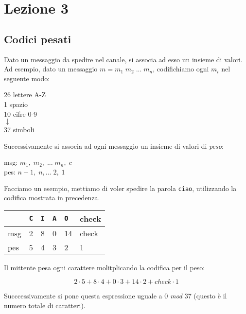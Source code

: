 \section*{Lezione 3}

\subsection*{Codici pesati}
Dato un messaggio da spedire nel canale, si associa ad esso un insieme di valori.
Ad esempio, dato un messaggio $m = m_1 \; m_2 \; ... \; m_n$, codifichiamo ogni $m_i$ nel seguente modo:
\begin{center}
	26 lettere A-Z\\
	1 spazio \textvisiblespace\\
	10 cifre 0-9\\
	$\downarrow$\\
	37 simboli
\end{center}

Successivamente si associa ad ogni messaggio un insieme di valori di \textit{peso}:

\begin{center}
	 msg: $m_1, \; m_2, \; ... \; m_n, \; c$\\
	 pes: $n+1, \; n, ... \; 2, \; 1 $
\end{center}

Facciamo un esempio, mettiamo di voler spedire la parola \texttt{ciao}, utilizzando la codifica mostrata in precedenza.

\begin{table}[h]
	\centering
	\begin{tabular}{llllll}
		& \texttt{C} & \texttt{I} & \texttt{A} & \texttt{O}  & check \\
		\hline
		msg & 2 & 8 & 0 & 14 & check \\
		pes & 5 & 4 & 3 & 2  & 1    
	\end{tabular}
\end{table}

Il mittente pesa ogni carattere molitplicando la codifica per il peso:

\begin{equation*}
	2 \cdot 5 + 8 \cdot 4 + 0 \cdot 3 + 14 \cdot 2 + check \cdot 1
\end{equation*}

Succcessivamente si pone questa espressione uguale a 0 \textit{mod} 37 (questo è il numero totale di caratteri).

